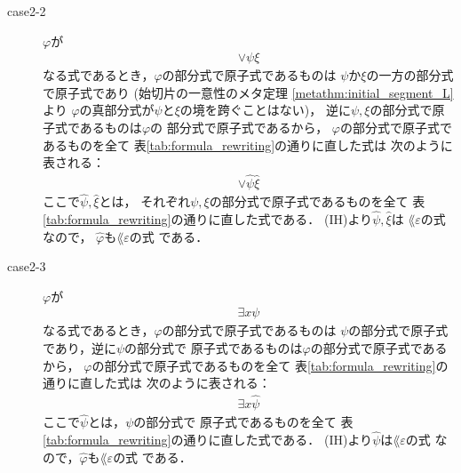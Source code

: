 \begin{metaprf}
\begin{description}
\begin{description}
\begin{description}
							\item[case2-2] $\varphi$が
								\begin{align}
									\vee \psi \xi
								\end{align}
								なる式であるとき，$\varphi$の部分式で原子式であるものは
								$\psi$か$\xi$の一方の部分式で原子式であり
								(始切片の一意性のメタ定理
								\ref{metathm:initial_segment_L}より
								$\varphi$の真部分式が$\psi$と$\xi$の境を跨ぐことはない)，
								逆に$\psi,\xi$の部分式で原子式であるものは$\varphi$の
								部分式で原子式であるから，
								$\varphi$の部分式で原子式であるものを全て
								表\ref{tab:formula_rewriting}の通りに直した式は
								次のように表される：
								\begin{align}
									\vee \widehat{\psi} \widehat{\xi}
								\end{align}
								ここで$\widehat{\psi},\widehat{\xi}$とは，
								それぞれ$\psi,\xi$の部分式で原子式であるものを全て
								表\ref{tab:formula_rewriting}の通りに直した式である．
								(IH)より$\widehat{\psi},\widehat{\xi}$は
								$\lang{\varepsilon}$の式なので，
								$\widehat{\varphi}$も$\lang{\varepsilon}$の式
								である．
								
							\item[case2-3] $\varphi$が
								\begin{align}
									\exists x \psi
								\end{align}
								なる式であるとき，$\varphi$の部分式で原子式であるものは
								$\psi$の部分式で原子式であり，逆に$\psi$の部分式で
								原子式であるものは$\varphi$の部分式で原子式であるから，
								$\varphi$の部分式で原子式であるものを全て
								表\ref{tab:formula_rewriting}の通りに直した式は
								次のように表される：
								\begin{align}
									\exists x \widehat{\psi}
								\end{align}
								ここで$\widehat{\psi}$とは，$\psi$の部分式で
								原子式であるものを全て
								表\ref{tab:formula_rewriting}の通りに直した式である．
								(IH)より$\widehat{\psi}$は$\lang{\varepsilon}$の式
								なので，$\widehat{\varphi}$も$\lang{\varepsilon}$の式
								である．
						\end{description}
				\end{description}
				

\end{description}
\end{metaprf}
